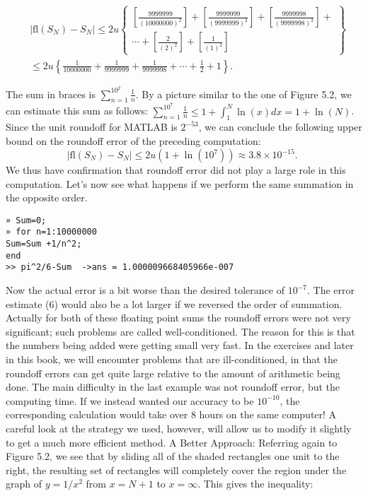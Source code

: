 \documentclass[../main.tex]{subfiles}
\begin{document}
$$
\begin{aligned}
&\left|\mathrm{fl}\left(S_{N}\right)-S_{N}\right| \leq 2 u\left\{\begin{array}{c}
{\left[\frac{9999999}{(10000000)^{2}}\right]+\left[\frac{9999999}{(9999999)^{2}}\right]+\left[\frac{9999998}{(9999998)^{2}}\right]+} \\
\cdots+\left[\frac{2}{(2)^{2}}\right]+\left[\frac{1}{(1)^{2}}\right]
\end{array}\right\}\\
&\leq 2 u\left\{\frac{1}{10000000}+\frac{1}{9999999}+\frac{1}{9999998}+\cdots+\frac{1}{2}+1\right\} \text {. }
\end{aligned}
$$

The sum in braces is $\sum_{n=1}^{10^{2}} \frac{1}{n}$. By a picture similar to the one of Figure 5.2, we can estimate this sum as follows: $\sum_{n=1}^{10^{7}} \frac{1}{n} \leq 1+\int_{1}^{N} \ln (x) d x=1+\ln (N)$. Since the unit roundoff for MATLAB is $2^{-53}$, we can conclude the following upper bound on the roundoff error of the preceding computation:
$$
\left|\mathrm{fl}\left(S_{N}\right)-S_{N}\right| \leq 2 u\left(1+\ln \left(10^{7}\right)\right) \approx 3.8 \times 10^{-15} \text {. }
$$
We thus have confirmation that roundoff error did not play a large role in this computation. Let's now see what happens if we perform the same summation in the opposite order.

\begin{verbatim}
» Sum=0;
» for n=1:10000000
Sum=Sum +1/n^2;
end
>> pi^2/6-Sum  ->ans = 1.000009668405966e-007
\end{verbatim}


Now the actual error is a bit worse than the desired tolerance of $10^{-7}$. The error estimate (6) would also be a lot larger if we reversed the order of summation. Actually for both of these floating point sums the roundoff errors were not very significant; such problems are called well-conditioned. The reason for this is that the numbers being added were getting small very fast. In the exercises and later in this book, we will encounter problems that are ill-conditioned, in that the roundoff errors can get quite large relative to the amount of arithmetic being done. The main difficulty in the last example was not roundoff error, but the computing time. If we instead wanted our accuracy to be $10^{-10}$, the corresponding calculation would take over 8 hours on the same computer! A careful look at the strategy we used, however, will allow us to modify it slightly to get a much more efficient method. A Better Approach: Referring again to Figure 5.2, we see that by sliding all of the shaded rectangles one unit to the right, the resulting set of rectangles will completely cover the region under the graph of $y=1 / x^{2}$ from $x=N+1$ to $x=\infty$. This gives the inequality:
\end{document}

